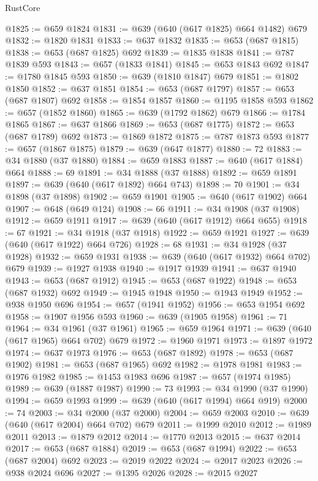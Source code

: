 \begin{lexlean}{RustCore}
\begin{coremodule}
@1825 := @659 @1824
@1831 := @639 (@640 (@617 @1825) @664 @1482) @679
@1832 := @1820 @1831
@1833 := @637 @1832
@1835 := @653 (@687 @1815)
@1838 := @653 (@687 @1825) @692
@1839 := @1835 @1838
@1841 := @787 @1839 @593
@1843 := @657 (@1833 @1841)
@1845 := @653 @1843 @692
@1847 := @1780 @1845 @593
@1850 := @639 (@1810 @1847) @679
@1851 := @1802 @1850
@1852 := @637 @1851
@1854 := @653 (@687 @1797)
@1857 := @653 (@687 @1807) @692
@1858 := @1854 @1857
@1860 := @1195 @1858 @593
@1862 := @657 (@1852 @1860)
@1865 := @639 (@1792 @1862) @679
@1866 := @1784 @1865
@1867 := @637 @1866
@1869 := @653 (@687 @1775)
@1872 := @653 (@687 @1789) @692
@1873 := @1869 @1872
@1875 := @787 @1873 @593
@1877 := @657 (@1867 @1875)
@1879 := @639 (@647 @1877)
@1880 := 72
@1883 := @34 @1880 (@37 @1880)
@1884 := @659 @1883
@1887 := @640 (@617 @1884) @664
@1888 := 69
@1891 := @34 @1888 (@37 @1888)
@1892 := @659 @1891
@1897 := @639 (@640 (@617 @1892) @664 @743)
@1898 := 70
@1901 := @34 @1898 (@37 @1898)
@1902 := @659 @1901
@1905 := @640 (@617 @1902) @664
@1907 := @648 (@649 @124)
@1908 := 66
@1911 := @34 @1908 (@37 @1908)
@1912 := @659 @1911
@1917 := @639 (@640 (@617 @1912) @664 @655)
@1918 := 67
@1921 := @34 @1918 (@37 @1918)
@1922 := @659 @1921
@1927 := @639 (@640 (@617 @1922) @664 @726)
@1928 := 68
@1931 := @34 @1928 (@37 @1928)
@1932 := @659 @1931
@1938 := @639 (@640 (@617 @1932) @664 @702) @679
@1939 := @1927 @1938
@1940 := @1917 @1939
@1941 := @637 @1940
@1943 := @653 (@687 @1912)
@1945 := @653 (@687 @1922)
@1948 := @653 (@687 @1932) @692
@1949 := @1945 @1948
@1950 := @1943 @1949
@1952 := @938 @1950 @696
@1954 := @657 (@1941 @1952)
@1956 := @653 @1954 @692
@1958 := @1907 @1956 @593
@1960 := @639 (@1905 @1958)
@1961 := 71
@1964 := @34 @1961 (@37 @1961)
@1965 := @659 @1964
@1971 := @639 (@640 (@617 @1965) @664 @702) @679
@1972 := @1960 @1971
@1973 := @1897 @1972
@1974 := @637 @1973
@1976 := @653 (@687 @1892)
@1978 := @653 (@687 @1902)
@1981 := @653 (@687 @1965) @692
@1982 := @1978 @1981
@1983 := @1976 @1982
@1985 := @1453 @1983 @696
@1987 := @657 (@1974 @1985)
@1989 := @639 (@1887 @1987)
@1990 := 73
@1993 := @34 @1990 (@37 @1990)
@1994 := @659 @1993
@1999 := @639 (@640 (@617 @1994) @664 @919)
@2000 := 74
@2003 := @34 @2000 (@37 @2000)
@2004 := @659 @2003
@2010 := @639 (@640 (@617 @2004) @664 @702) @679
@2011 := @1999 @2010
@2012 := @1989 @2011
@2013 := @1879 @2012
@2014 := @1770 @2013
@2015 := @637 @2014
@2017 := @653 (@687 @1884)
@2019 := @653 (@687 @1994)
@2022 := @653 (@687 @2004) @692
@2023 := @2019 @2022
@2024 := @2017 @2023
@2026 := @938 @2024 @696
@2027 := @1395 @2026
@2028 := @2015 @2027

\end{coremodule}
\end{lexlean}
